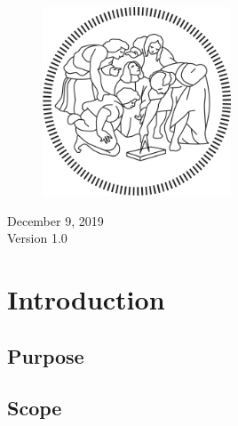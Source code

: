 \documentclass[a4paper]{article}
\begin{document}
\begin{titlepage}
	
	\vfill\vfill\vfill
	
	\begin{figure}[H]
	\centering
	\includegraphics[width=0.5\textwidth]{polimi_logo}
	\end{figure}
	
	
	\vfill\vfill\vfill
	
	{\large December 9, 2019\\ Version 1.0} %
	
	\vfill
	
\end{titlepage}


\newpage
{}

\tableofcontents

\newpage
{}

\section{Introduction}

\subsection{Purpose}
\subsection{Scope}
\end{document}
